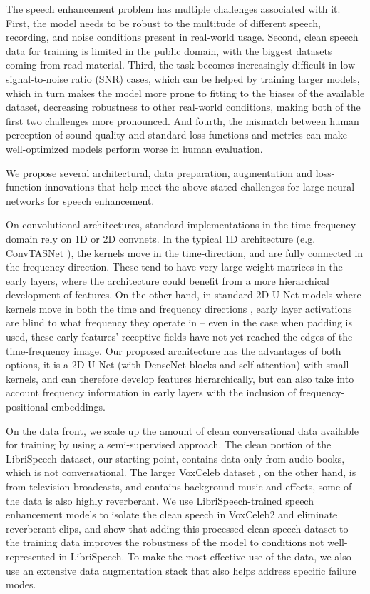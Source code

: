 \documentclass[english]{article}
\begin{document}
The speech enhancement problem has multiple challenges associated with it. First, the model needs to be robust to the multitude of different speech, recording, and noise conditions present in real-world usage. Second, clean speech data for training is limited in the public domain, with the biggest datasets coming from read material. Third, the task becomes increasingly difficult in low signal-to-noise ratio (SNR) cases, which can be helped by training larger models, which in turn makes the model more prone to fitting to the biases of the available dataset, decreasing robustness to other real-world conditions, making both of the first two challenges more pronounced. And fourth, the mismatch between human perception of sound quality and standard loss functions and metrics \cite{hu2007evaluation} can make well-optimized models perform worse in human evaluation. 

We propose several architectural, data preparation, augmentation and loss-function innovations that help meet the above stated challenges for large neural networks for speech enhancement. 

On convolutional architectures, standard implementations in the time-frequency domain rely on 1D or 2D convnets. In the typical 1D architecture (e.g. ConvTASNet \cite{luo2019conv}), the kernels move in the time-direction, and are fully connected in the frequency direction. These tend to have very large weight matrices in the early layers, where the architecture could benefit from a more hierarchical development of features. On the other hand, in standard 2D U-Net models where kernels move in both the time and frequency directions \cite{park2017fully}, early layer activations are blind to what frequency they operate in -- even in the case when padding is used, these early features' receptive fields have not yet reached the edges of the time-frequency image. Our proposed architecture has the advantages of both options, it is a 2D U-Net (with DenseNet blocks and self-attention) with small kernels, and can therefore develop features hierarchically, but can also take into account frequency information in early layers with the inclusion of frequency-positional embeddings. 

On the data front, we scale up the amount of clean conversational data available for training by using a semi-supervised approach. The clean portion of the LibriSpeech dataset, our starting point, contains data only from audio books, which is not conversational. The larger VoxCeleb dataset \cite{nagrani2017voxceleb}, on the other hand, is from television broadcasts, and contains background music and effects, some of the data is also highly reverberant. We use LibriSpeech-trained speech enhancement models to isolate the clean speech in VoxCeleb2 and eliminate reverberant clips, and show that adding this processed clean speech dataset to the training data improves the robustness of the model to conditions not well-represented in LibriSpeech. To make the most effective use of the data, we also use an extensive data augmentation stack that also helps address specific failure modes. 
\end{document}
